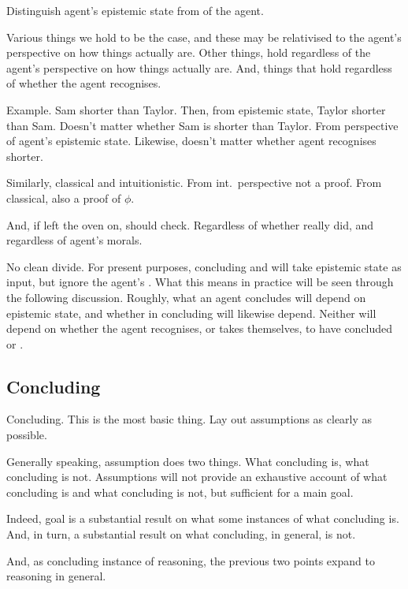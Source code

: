 \begin{note}
  Distinguish agent's epistemic state from \stance{} of the agent.

  Various things we hold to be the case, and these may be relativised to the agent's perspective on how things actually are.
  Other things, hold regardless of the agent's perspective on how things actually are.
  And, things that hold regardless of whether the agent recognises.

  Example.
  Sam shorter than Taylor.
  Then, from epistemic state, Taylor shorter than Sam.
  Doesn't matter whether Sam is shorter than Taylor.
  From perspective of agent's epistemic state.
  Likewise, doesn't matter whether agent recognises shorter.

  Similarly, classical and intuitionistic.
  From int.\ perspective not a proof.
  From classical, also a proof of \(\phi\).

  And, if left the oven on, should check.
  Regardless of whether really did, and regardless of agent's morals.

  No clean divide.
  For present purposes, concluding and \csN{} will take epistemic state as input, but ignore the agent's \stance{}.
  What this means in practice will be seen through the following discussion.
  Roughly, what an agent concludes will depend on epistemic state, and whether \csN{} in concluding will likewise depend.
  Neither will depend on whether the agent recognises, or takes themselves, to have concluded or \csVed{}.
\end{note}

\subsection{Concluding}
\label{sec:outline:concluding}

\begin{note}[Overview]
  Concluding.
  This is the most basic thing.
  Lay out assumptions as clearly as possible.

  Generally speaking, assumption does two things.
  What concluding is, what concluding is not.
  Assumptions will not provide an exhaustive account of what concluding is and what concluding is not, but sufficient for a main goal.

  Indeed, goal is a substantial result on what some instances of what concluding is.
  And, in turn, a substantial result on what concluding, in general, is not.

  And, as concluding instance of reasoning, the previous two points expand to reasoning in general.
\end{note}


